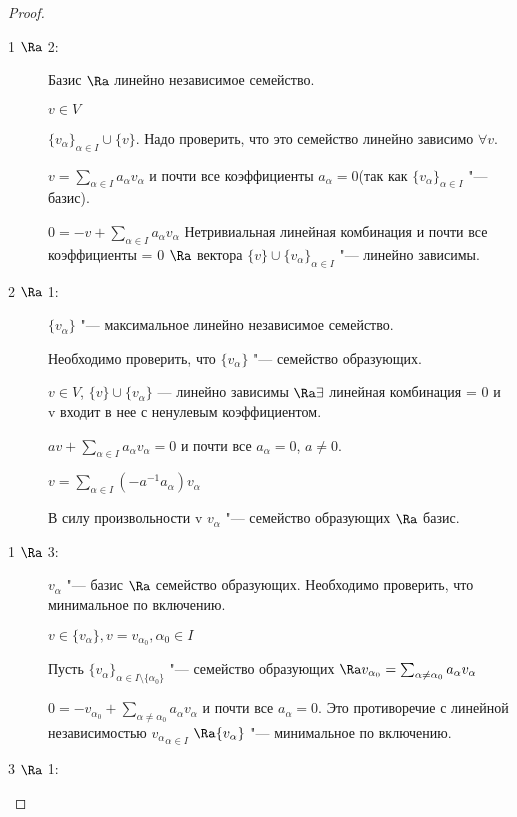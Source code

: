 \begin{proof}
\begin{description}
\item [1 $\Ra$ 2:]
    
    Базис $\Ra$ линейно независимое семейство. 

    $v \in V$

    $\{v_{\alpha}\}_{\alpha \in I} \cup \{v\}$. Надо проверить, что это
    семейство линейно зависимо $\forall v$. 
    
    $v = \sum_{\alpha \in I} a_{\alpha}v_{\alpha}$ и почти все 
    коэффициенты $a_{\alpha} = 0$(так как $\{v_{\alpha}\}_{\alpha \in I}$ "--- базис).
    
    $0 = -v + \sum_{\alpha \in I} a_{\alpha}v_{\alpha}$
    Нетривиальная линейная комбинация и почти все коэффициенты = 0 $\Ra$ вектора $\{v\} \cup \{v_{\alpha}\}_{\alpha \in I}$ "--- линейно зависимы.

\item [2 $\Ra$  1:] 
$\{v_{\alpha}\}$ "--- максимальное линейно независимое семейство.

Необходимо проверить, что $\{v_{\alpha}\}$ "--- семейство образующих.

$v \in V$, $\{v\} \cup \{v_{\alpha}\}$ --- линейно зависимы
$\Ra \exists$ линейная комбинация = 0 и v входит в нее с ненулевым коэффициентом.

$av + \sum_{\alpha \in I}a_{\alpha}v_{\alpha} = 0$  и почти все $a_{\alpha} = 0$, $a \ne 0$.

$v = \sum_{\alpha \in I}(-a^{-1}a_{\alpha})v_{\alpha}$

В силу произвольности v ${v_{\alpha}}$ "--- семейство образующих $\Ra$ базис.

\item [1 $\Ra$ 3:]

${v_{\alpha}}$ "--- базис $\Ra$ семейство образующих.
Необходимо проверить, что минимальное по включению.

$v \in \{v_{\alpha}\}, v = v_{\alpha_0}, \alpha_0 \in I$

Пусть $\{v_{\alpha}\}_{\alpha \in I \setminus \{\alpha_0\}}$ "--- семейство образующих
$\Ra v_{\alpha_0} = \sum_{\alpha \ne \alpha_0} a_{\alpha}v_{\alpha}$

$0 = -v_{\alpha_0} + \sum_{\alpha \ne \alpha_0}a_{\alpha} v_{\alpha}$ 
и почти все $a_{\alpha} = 0$.  
Это противоречие с линейной независимостью ${v_\alpha}_{{\alpha} \in I}$
$\Ra \{v_{\alpha}\}$ "--- минимальное по включению. 

\item [3 $\Ra$ 1:] 


\end{description}
\end{proof}
